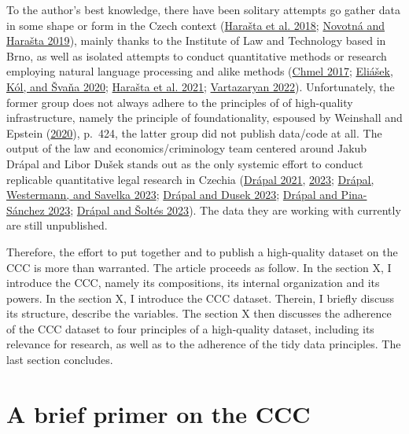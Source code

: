 \documentclass[
  11pt,
]{article}
\begin{document}
To the author's best knowledge, there have been solitary attempts go
gather data in some shape or form in the Czech context
(\protect\hyperlink{ref-harastaAnnotatedCorpusCzech2018}{Harašta et al.
2018}; \protect\hyperlink{ref-novotnaCzechCourtDecisions2019}{Novotná
and Harašta 2019}), mainly thanks to the Institute of Law and Technology
based in Brno, as well as isolated attempts to conduct quantitative
methods or research employing natural language processing and alike
methods (\protect\hyperlink{ref-chmelZpravodajoveSenatyVliv2017}{Chmel
2017};
\protect\hyperlink{ref-eliasekAutomatickaKlasifikaceVyznamovych2020}{Eliášek,
Kól, and Švaňa 2020};
\protect\hyperlink{ref-harastaCitacniAnalyzaJudikatury2021}{Harašta et
al. 2021};
\protect\hyperlink{ref-vartazaryanSitOvaAnalyza2022}{Vartazaryan 2022}).
Unfortunately, the former group does not always adhere to the principles
of of high-quality infrastructure, namely the principle of
foundationality, espoused by Weinshall and Epstein
(\protect\hyperlink{ref-weinshallDevelopingHighQualityData2020}{2020}),
p.~424, the latter group did not publish data/code at all. The output of
the law and economics/criminology team centered around Jakub Drápal and
Libor Dušek stands out as the only systemic effort to conduct replicable
quantitative legal research in Czechia
(\protect\hyperlink{ref-drapalSentencingCzechRepublic2021}{Drápal 2021},
\protect\hyperlink{ref-drapalPunitiveNegligenceMyths2023}{2023};
\protect\hyperlink{ref-drapalUsingLargeLanguage2023}{Drápal, Westermann,
and Savelka 2023};
\protect\hyperlink{ref-drapalLawAuthorityHow2023}{Drápal and Dusek
2023}; \protect\hyperlink{ref-drapalWhatValueJudicial2023}{Drápal and
Pina-Sánchez 2023};
\protect\hyperlink{ref-drapalSentencingDecisionsQuantity2023}{Drápal and
Šoltés 2023}). The data they are working with currently are still
unpublished.

Therefore, the effort to put together and to publish a high-quality
dataset on the CCC is more than warranted. The article proceeds as
follow. In the section X, I introduce the CCC, namely its compositions,
its internal organization and its powers. In the section X, I introduce
the CCC dataset. Therein, I briefly discuss its structure, describe the
variables. The section X then discusses the adherence of the CCC dataset
to four principles of a high-quality dataset, including its relevance
for research, as well as to the adherence of the tidy data principles.
The last section concludes.

\hypertarget{a-brief-primer-on-the-ccc}{%
\section{A brief primer on the CCC}\label{a-brief-primer-on-the-ccc}}
\end{document}
